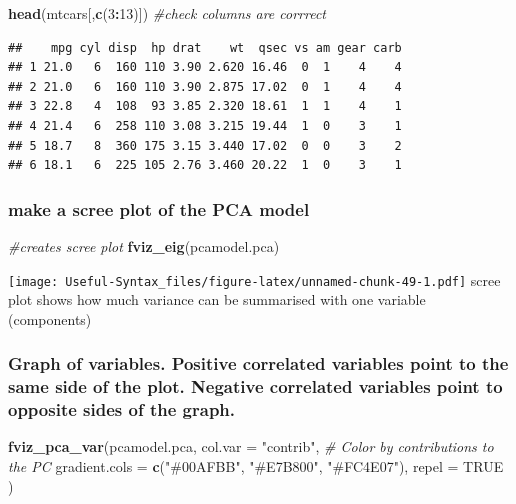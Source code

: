 \documentclass[
]{article}
\newenvironment{Shaded}{\begin{snugshade}}{\end{snugshade}}
\newcommand{\AttributeTok}[1]{\textcolor[rgb]{0.13,0.29,0.53}{#1}}
\newcommand{\CommentTok}[1]{\textcolor[rgb]{0.56,0.35,0.01}{\textit{#1}}}
\newcommand{\ConstantTok}[1]{\textcolor[rgb]{0.56,0.35,0.01}{#1}}
\newcommand{\DecValTok}[1]{\textcolor[rgb]{0.00,0.00,0.81}{#1}}
\newcommand{\FunctionTok}[1]{\textcolor[rgb]{0.13,0.29,0.53}{\textbf{#1}}}
\newcommand{\NormalTok}[1]{#1}
\newcommand{\SpecialCharTok}[1]{\textcolor[rgb]{0.81,0.36,0.00}{\textbf{#1}}}
\newcommand{\StringTok}[1]{\textcolor[rgb]{0.31,0.60,0.02}{#1}}
\begin{document}
\begin{Shaded}
\begin{Highlighting}[]
\FunctionTok{head}\NormalTok{(mtcars[,}\FunctionTok{c}\NormalTok{(}\DecValTok{3}\SpecialCharTok{:}\DecValTok{13}\NormalTok{)]) }\CommentTok{\#check columns are corrrect}
\end{Highlighting}
\end{Shaded}

\begin{verbatim}
##    mpg cyl disp  hp drat    wt  qsec vs am gear carb
## 1 21.0   6  160 110 3.90 2.620 16.46  0  1    4    4
## 2 21.0   6  160 110 3.90 2.875 17.02  0  1    4    4
## 3 22.8   4  108  93 3.85 2.320 18.61  1  1    4    1
## 4 21.4   6  258 110 3.08 3.215 19.44  1  0    3    1
## 5 18.7   8  360 175 3.15 3.440 17.02  0  0    3    2
## 6 18.1   6  225 105 2.76 3.460 20.22  1  0    3    1
\end{verbatim}

\hypertarget{make-a-scree-plot-of-the-pca-model}{%
\subsubsection{make a scree plot of the PCA model}\label{make-a-scree-plot-of-the-pca-model}}

\begin{Shaded}
\begin{Highlighting}[]
\CommentTok{\#creates scree plot}
\FunctionTok{fviz\_eig}\NormalTok{(pcamodel.pca)}
\end{Highlighting}
\end{Shaded}

\texttt{[image: Useful-Syntax\_files/figure-latex/unnamed-chunk-49-1.pdf]}
scree plot shows how much variance can be summarised with one variable (components)

\hypertarget{graph-of-variables.-positive-correlated-variables-point-to-the-same-side-of-the-plot.-negative-correlated-variables-point-to-opposite-sides-of-the-graph.}{%
\subsubsection{Graph of variables. Positive correlated variables point to the same side of the plot. Negative correlated variables point to opposite sides of the graph.}\label{graph-of-variables.-positive-correlated-variables-point-to-the-same-side-of-the-plot.-negative-correlated-variables-point-to-opposite-sides-of-the-graph.}}

\begin{Shaded}
\begin{Highlighting}[]
\FunctionTok{fviz\_pca\_var}\NormalTok{(pcamodel.pca,}
             \AttributeTok{col.var =} \StringTok{"contrib"}\NormalTok{, }\CommentTok{\# Color by contributions to the PC}
             \AttributeTok{gradient.cols =} \FunctionTok{c}\NormalTok{(}\StringTok{"\#00AFBB"}\NormalTok{, }\StringTok{"\#E7B800"}\NormalTok{, }\StringTok{"\#FC4E07"}\NormalTok{),}
             \AttributeTok{repel =} \ConstantTok{TRUE}\NormalTok{   )}
\end{Highlighting}
\end{Shaded}
\end{document}
